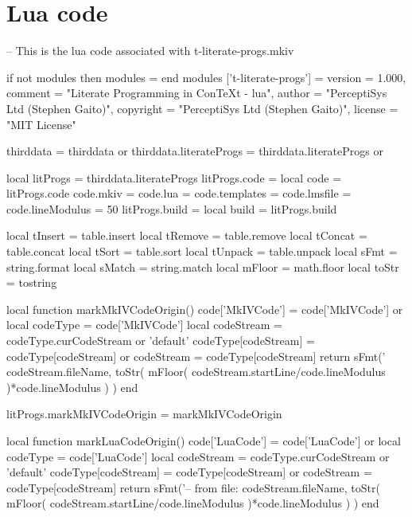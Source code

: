 
\unprotect

\stopMkIVCode

\section{Lua code}

\startLuaCode
-- This is the lua code associated with t-literate-progs.mkiv

if not modules then modules = { } end
modules ['t-literate-progs'] = {
    version   = 1.000,
    comment   = "Literate Programming in ConTeXt - lua",
    author    = "PerceptiSys Ltd (Stephen Gaito)",
    copyright = "PerceptiSys Ltd (Stephen Gaito)",
    license   = "MIT License"
}

thirddata               = thirddata               or {}
thirddata.literateProgs = thirddata.literateProgs or {}

local litProgs   = thirddata.literateProgs
litProgs.code    = {}
local code       = litProgs.code
code.mkiv        = {}
code.lua         = {}
code.templates   = {}
code.lmsfile     = {}
code.lineModulus = 50
litProgs.build   = {}
local build      = litProgs.build

local tInsert = table.insert
local tRemove = table.remove
local tConcat = table.concat
local tSort   = table.sort
local tUnpack = table.unpack
local sFmt    = string.format
local sMatch  = string.match
local mFloor  = math.floor
local toStr   = tostring
\stopLuaCode

\startLuaCode
local function markMkIVCodeOrigin()
  code['MkIVCode']     = code['MkIVCode'] or { }
  local codeType       = code['MkIVCode']
  local codeStream     = codeType.curCodeStream or 'default'
  codeType[codeStream] = codeType[codeStream] or { }
  codeStream           = codeType[codeStream]
  return sFmt('%
    codeStream.fileName,
    toStr(
      mFloor(
        codeStream.startLine/code.lineModulus
      )*code.lineModulus
    )
  )
end

litProgs.markMkIVCodeOrigin = markMkIVCodeOrigin

local function markLuaCodeOrigin()
  code['LuaCode']      = code['LuaCode'] or { }
  local codeType       = code['LuaCode']
  local codeStream     = codeType.curCodeStream or 'default'
  codeType[codeStream] = codeType[codeStream] or { }
  codeStream           = codeType[codeStream]
  return sFmt('-- from file: %
    codeStream.fileName,
    toStr(
      mFloor(
        codeStream.startLine/code.lineModulus
      )*code.lineModulus
    )
  )
end

